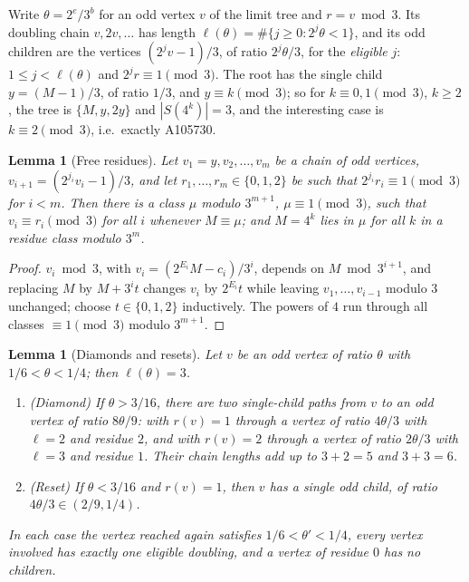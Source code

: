 \documentclass[11pt,a4paper]{article}
\newtheorem{lemma}[theorem]{Lemma}
\theoremstyle{definition}
\theoremstyle{remark}
\numberwithin{equation}{section}
\begin{document}
Write $\theta=2^e/3^b$ for an odd vertex $v$ of the limit tree and $r=v\bmod3$.
Its doubling chain $v,2v,\dots$ has length $\ell(\theta)=\#\{j\ge0:2^j\theta<1\}$,
and its odd children are the vertices $(2^jv-1)/3$, of ratio $2^j\theta/3$, for
the \emph{eligible} $j$: $1\le j<\ell(\theta)$ and $2^jr\equiv1\pmod3$. The root
has the single child $y=(M-1)/3$, of ratio $1/3$, and $y\equiv k\pmod3$; so for
$k\equiv0,1\pmod3$, $k\ge2$, the tree is $\{M,y,2y\}$ and $|S(4^k)|=3$, and the
interesting case is $k\equiv2\pmod3$, i.e.\ exactly A105730.

\begin{lemma}[Free residues]\label{B:P:lem:freeres}
Let $v_1=y,v_2,\dots,v_m$ be a chain of odd vertices, $v_{i+1}=(2^{j_i}v_i-1)/3$,
and let $r_1,\dots,r_m\in\{0,1,2\}$ be such that $2^{j_i}r_i\equiv1\pmod3$ for
$i<m$. Then there is a class $\mu$ modulo $3^{m+1}$, $\mu\equiv1\pmod3$, such that
$v_i\equiv r_i\pmod3$ for all $i$ whenever $M\equiv\mu$; and $M=4^k$ lies in
$\mu$ for all $k$ in a residue class modulo $3^m$.
\end{lemma}

\begin{proof}
$v_i\bmod3$, with $v_i=(2^{E_i}M-c_i)/3^i$, depends on $M\bmod3^{i+1}$, and replacing $M$ by
$M+3^it$ changes $v_i$ by $2^{E_i}t$ while leaving $v_1,\dots,v_{i-1}$ modulo $3$
unchanged; choose $t\in\{0,1,2\}$ inductively. The powers of $4$ run through all
classes $\equiv1\pmod3$ modulo $3^{m+1}$.
\end{proof}

\begin{lemma}[Diamonds and resets]\label{B:P:lem:diamond}
Let $v$ be an odd vertex of ratio $\theta$ with $1/6<\theta<1/4$; then
$\ell(\theta)=3$.
\begin{enumerate}
\item (Diamond) If $\theta>3/16$, there are two single-child paths from $v$ to an
odd vertex of ratio $8\theta/9$: with $r(v)=1$ through a vertex of ratio
$4\theta/3$ with $\ell=2$ and residue $2$, and with $r(v)=2$ through a vertex of
ratio $2\theta/3$ with $\ell=3$ and residue $1$. Their chain lengths add up to
$3+2=5$ and $3+3=6$.
\item (Reset) If $\theta<3/16$ and $r(v)=1$, then $v$ has a single odd child, of
ratio $4\theta/3\in(2/9,1/4)$.
\end{enumerate}
In each case the vertex reached again satisfies $1/6<\theta'<1/4$, every vertex
involved has exactly one eligible doubling, and a vertex of residue $0$ has no
children.
\end{lemma}
\end{document}
